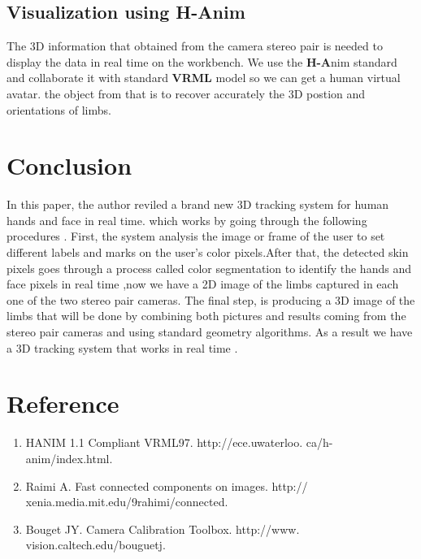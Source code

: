 \documentclass[a4paper]{article}
\begin{document}
\subsection{Visualization using H-Anim}
The 3D information that obtained from the camera stereo pair is needed to display the data in real time on the workbench.
We use the {\bf H-A}nim standard and collaborate it with standard {\bf VRML} model so we can get a human virtual avatar.
the object from that is to recover accurately the 3D postion and orientations of limbs.
 
\section{Conclusion}

In this paper, the author reviled a brand new 3D tracking system for human hands and face in real time.
which works by going through the following procedures . First, the system analysis the image or frame of the user to set different labels and marks on the
user's color pixels.After that, the detected skin pixels goes through a process called color segmentation to identify the hands and face pixels in
real time ,now we have a 2D image of the limbs captured in each one of the two stereo pair cameras. The final step, is producing a 3D image of the limbs
that will be done by combining both pictures and results coming from the stereo pair cameras and using standard geometry algorithms. As a result we have a 3D tracking system that works in real time .

\section{Reference}
\begin{enumerate}
\item HANIM 1.1 Compliant VRML97. http://ece.uwaterloo.
ca/h-anim/index.html.
\item Raimi A. Fast connected components on images. http://
xenia.media.mit.edu/9rahimi/connected.
\item Bouget JY. Camera Calibration Toolbox. http://www.
vision.caltech.edu/bouguetj.
\end{enumerate}
\end{document}
